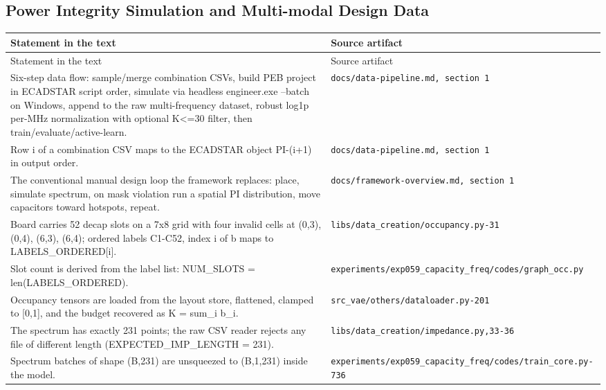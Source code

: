 \subsection*{Power Integrity Simulation and Multi-modal Design Data}
\begingroup\small
\begin{longtable}{p{} p{}}
\hline
Statement in the text & Source artifact \\
\hline
\endfirsthead
\hline
Statement in the text & Source artifact \\
\hline
\endhead
Six-step data flow: sample/merge combination CSVs, build PEB project in ECADSTAR script order, simulate via headless engineer.exe --batch on Windows, append to the raw multi-frequency dataset, robust log1p per-MHz normalization with optional K<=30 filter, then train/evaluate/active-learn. & \texttt{docs/\allowbreak{}data-pipeline.md, section 1} \\
Row i of a combination CSV maps to the ECADSTAR object PI-(i+1) in output order. & \texttt{docs/\allowbreak{}data-pipeline.md, section 1} \\
The conventional manual design loop the framework replaces: place, simulate spectrum, on mask violation run a spatial PI distribution, move capacitors toward hotspots, repeat. & \texttt{docs/\allowbreak{}framework-overview.md, section 1} \\
Board carries 52 decap slots on a 7x8 grid with four invalid cells at (0,3), (0,4), (6,3), (6,4); ordered labels C1-C52, index i of b maps to LABELS\_ORDERED[i]. & \texttt{libs/\allowbreak{}data\_\allowbreak{}creation/\allowbreak{}occupancy.py-31} \\
Slot count is derived from the label list: NUM\_SLOTS = len(LABELS\_ORDERED). & \texttt{experiments/\allowbreak{}exp059\_\allowbreak{}capacity\_\allowbreak{}freq/\allowbreak{}codes/\allowbreak{}graph\_\allowbreak{}occ.py} \\
Occupancy tensors are loaded from the layout store, flattened, clamped to [0,1], and the budget recovered as K = sum\_i b\_i. & \texttt{src\_\allowbreak{}vae/\allowbreak{}others/\allowbreak{}dataloader.py-201} \\
The spectrum has exactly 231 points; the raw CSV reader rejects any file of different length (EXPECTED\_IMP\_LENGTH = 231). & \texttt{libs/\allowbreak{}data\_\allowbreak{}creation/\allowbreak{}impedance.py,33-36} \\
Spectrum batches of shape (B,231) are unsqueezed to (B,1,231) inside the model. & \texttt{experiments/\allowbreak{}exp059\_\allowbreak{}capacity\_\allowbreak{}freq/\allowbreak{}codes/\allowbreak{}train\_\allowbreak{}core.py-736} \\

\end{longtable}
